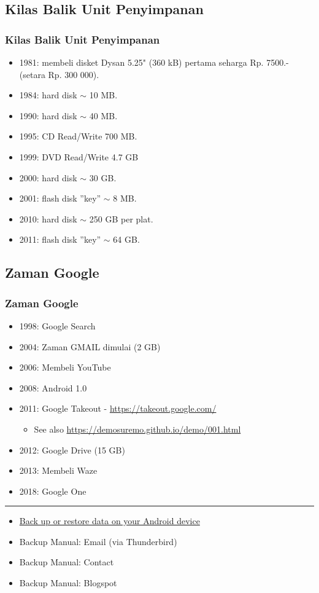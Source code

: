 \documentclass[xcolor=table, notheorems, hyperref={pdfpagelabels=false}]{beamer}
\begin{document}
\begin{frame}[fragile]
\section{Kilas Balik Unit Penyimpanan}
\frametitle{Kilas Balik Unit Penyimpanan}
\begin{itemize}
\item 1981: membeli disket Dysan 5.25" (360 kB) pertama seharga Rp. 7500.- (setara Rp. 300 000).
\item 1984: hard disk $\sim$ 10 MB.
\item 1990: hard disk $\sim$ 40 MB.
\item 1995: CD Read/Write 700 MB.
\item 1999: DVD Read/Write 4.7 GB
\item 2000: hard disk $\sim$ 30 GB.
\item 2001: flash disk ''key'' $\sim$ 8 MB.
\item 2010: hard disk $\sim$ 250 GB per plat.
\item 2011: flash disk ''key'' $\sim$ 64 GB.
\end{itemize}
\end{frame}

\begin{frame}[fragile]
\section{Zaman Google}
\frametitle{Zaman Google}
\begin{itemize}
\item 1998: Google Search
\item 2004: Zaman GMAIL dimulai (2 GB)
\item 2006: Membeli YouTube
\item 2008: Android 1.0
\item 2011: Google Takeout - \url{https://takeout.google.com/}
\begin{itemize}
\item See also \url{https://demosuremo.github.io/demo/001.html}
\end{itemize}
\item 2012: Google Drive (15 GB)
\item 2013: Membeli Waze
\item 2018: Google One
\end{itemize}

\noindent\rule{\textwidth}{1pt}

\begin{itemize}
\item \href{https://support.google.com/android/answer/2819582}{Back up or restore data on your Android device}
\item Backup Manual: Email (via Thunderbird)
\item Backup Manual: Contact
\item Backup Manual: Blogspot
\end{itemize}
\end{frame}
\end{document}
